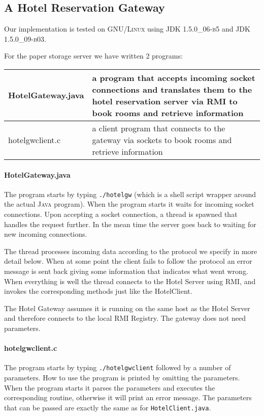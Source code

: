 \documentclass[a4paper,10pt]{article}
\begin{document}
\subsection{A Hotel Reservation Gateway}\label{sec:gateway}

Our implementation is tested on \textsc{GNU/Linux} using
\textsc{JDK 1.5.0\_06-b5} and \textsc{JDK 1.5.0\_09-b03}.

For the paper storage server we have written 2 programs:
\begin{center}
\begin{tabular}{ l | p{8.2cm} }
HotelGateway.java & a program that accepts incoming socket connections and translates them to the hotel reservation server via RMI to book rooms and retrieve information\\ \hline
hotelgwclient.c & a client program that connects to the gateway via sockets to book rooms and retrieve information\\
\end{tabular}
\end{center}

\paragraph{HotelGateway.java}
The program starts by typing \texttt{./hotelgw} (which is a shell
script wrapper around the actual \textsc{Java} program). When the
program starts it waits for incoming socket connections. Upon
accepting a socket connection, a thread is spawned that handles the
request further. In the mean time the server goes back to waiting for
new incoming connections.

The thread processes incoming data according to the protocol we
specify in more detail below. When at some point the client fails to follow the protocol
an error message is sent back giving some information that indicates
what went wrong. When everything is well the thread connects to the
Hotel Server using \textsc{RMI}, and invokes the corresponding methods just
like the HotelClient.

The Hotel Gateway assumes it is running on the same host as the Hotel
Server and therefore connects to the local RMI Registry. The gateway
does not need parameters.

\paragraph{hotelgwclient.c}
The program starts by typing \texttt{./hotelgwclient} followed by a
number of parameters. How to use the program is printed by omitting
the parameters. When the program starts it parses the parameters and
executes the corresponding routine, otherwise it will print an error
message. The parameters that can be passed are exactly the same as for
\texttt{HotelClient.java}.
\end{document}

